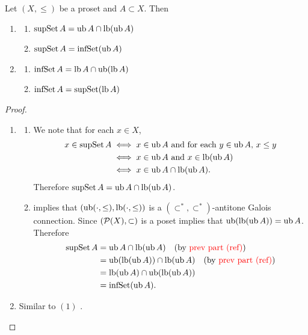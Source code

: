 \documentclass{book}
\begin{document}
	\begin{ex} 
		Let $(X, \leq)$ be a proset and $A \subset X$. Then 
		\begin{enumerate}
			\item 
			\begin{enumerate}
				\item $\operatorname{supSet} A = \operatorname{ub} A \cap \operatorname{lb} (\operatorname{ub} A)$
				\item $\operatorname{supSet} A = \operatorname{infSet} (\operatorname{ub} A)$
			\end{enumerate}
			\item 
			\begin{enumerate}
				\item $\operatorname{infSet} A = \operatorname{lb} A \cap \operatorname{ub}(\operatorname{lb} A)$
				\item $\operatorname{infSet} A = \operatorname{supSet} (\operatorname{lb} A)$
			\end{enumerate}
		\end{enumerate}
	\end{ex}
	
	\begin{proof}\
		\begin{enumerate}
			\item 
			\begin{enumerate}
				\item We note that for each $x \in X$,
				\begin{align*}
					x \in \operatorname{supSet} A
					& \iff \text{$x \in \operatorname{ub} A$ and for each $y \in \operatorname{ub} A$, $x \leq y$} \\
					& \iff \text{$x \in \operatorname{ub} A$ and $x \in \operatorname{lb}(\operatorname{ub} A)$} \\
					& \iff x \in \operatorname{ub} A \cap \operatorname{lb} (\operatorname{ub} A). 
				\end{align*}
				Therefore $\operatorname{supSet} A = \operatorname{ub} A \cap \operatorname{lb} (\operatorname{ub} A)$.
				\item {} implies that $(\operatorname{ub}(\cdot, \leq), \operatorname{lb}(\cdot, \leq))$ is a $(\subset^*, \subset^*)$-antitone Galois connection. Since $(\mathcal{P}(X), \subset)$ is a poset  implies that $\operatorname{ub} (\operatorname{lb} (\operatorname{ub} A)) = \operatorname{ub} A$. Therefore
				\begin{align*}
					\operatorname{supSet} A 
					& = \operatorname{ub} A \cap \operatorname{lb} (\operatorname{ub} A) \quad \text{(by \textcolor{red}{prev part (ref)})} \\
					& = \operatorname{ub} (\operatorname{lb} (\operatorname{ub} A)) \cap \operatorname{lb} (\operatorname{ub} A) \quad \text{(by \textcolor{red}{prev part (ref)})} \\
					& = \operatorname{lb} (\operatorname{ub} A) \cap \operatorname{ub} (\operatorname{lb} (\operatorname{ub} A)) \\
					& = \operatorname{infSet} (\operatorname{ub} A). 
				\end{align*}
			\end{enumerate}
			\item Similar to $(1)$ .
		\end{enumerate}
	\end{proof}
	
\end{document}
